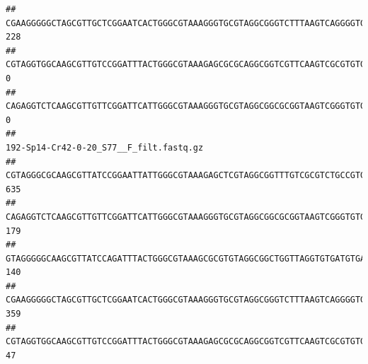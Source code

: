 \documentclass[]{article}
\begin{document}
\begin{verbatim}
## CGAAGGGGGCTAGCGTTGCTCGGAATCACTGGGCGTAAAGGGTGCGTAGGCGGGTCTTTAAGTCAGGGGTGAAATCCTGGAGCTCAACTCCAGAACTGCCTTTGATACTGAAGATCTTGAGTTCGGGAGAGGTGAGTGGAACTGCGAGTGTAGAGGTGAAATTCGTAGATATTCGCAAGAACACCAGTGGCGAAGGCGGCTCACTGGCCCGATACTGACGCTGAGGCACGAAAGCGTGGGGAGCAAACA                                     228
## CGTAGGTGGCAAGCGTTGTCCGGATTTACTGGGCGTAAAGAGCGCGCAGGCGGTCGTTCAAGTCGCGTGTGAAAGCCCCCGGCTCAACTGGGGAGGGTCACGCGATACTGATCGACTCGAAGGCAGGAGAGGGTAGTGGAATTCCCGGTGTAGTGGTGAAATGCGTAGATATCGGGAGGAACACCAGTGGCGAAGGCGACTACCTGGCCTGTTCTTGACGCTGAGGCGCGAAAGCTAGGGGAGCAAACG                                       0
## CAGAGGTCTCAAGCGTTGTTCGGATTCATTGGGCGTAAAGGGTGCGTAGGCGGCGCGGTAAGTCGGGTGTGAAATCTCGGGGCTTAACTCCGAAACTGCATTCGATACTGCCGTGCTTGAGGACTGGAGAGGAGACTGGAATTTACGGTGTAGCGGTGAAATGCGTAGATATCGTAAGGAAGACCAGTGGCGAAGGCGGGTCTCTGGACAGTTCCTGACGCTGAGGCACGAAGGCCAGGGGAGCAAACG                                       0
##                                                                                                                                                                                                                                                           192-Sp14-Cr42-0-20_S77__F_filt.fastq.gz
## CGTAGGGCGCAAGCGTTATCCGGAATTATTGGGCGTAAAGAGCTCGTAGGCGGTTTGTCGCGTCTGCCGTGAAAGTCCGGGGCTCAACTCCGGATCTGCGGTGGGTACGGGCAGACTAGAGTGATGTAGGGGAGACTGGAATTCCTGGTGTAGCGGTGAAATGCGCAGATATCAGGAGGAACACCGATGGCGAAGGCAGGTCTCTGGGCATTAACTGACGCTGAGGAGCGAAAGCATGGGGAGCGAACA                                     635
## CAGAGGTCTCAAGCGTTGTTCGGATTCATTGGGCGTAAAGGGTGCGTAGGCGGCGCGGTAAGTCGGGTGTGAAATCTCGGAGCTTAACTCCGAAACTGCATTCGATACTGCCGTGCTTGAGGACTGGAGAGGAGACTGGAATTTACGGTGTAGCGGTGAAATGCGTAGATATCGTAAGGAAGACCAGTGGCGAAGGCGGGTCTCTGGACAGTTCCTGACGCTGAGGCACGAAGGCCAGGGGAGCAAACG                                     179
## GTAGGGGGCAAGCGTTATCCAGATTTACTGGGCGTAAAGCGCGTGTAGGCGGCTGGTTAGGTGTGATGTGAAATCTTCCGGCTCAACCGGAAAACTGCATTGCAAACCGGCCTGGCTAGAGTGCAGGAGAGGGAAGCGGAATTCCAGGTGTAGCGGTGAAATGCGTAGATATCTGGAGGAACACCAGTGGCGAAGGCGGCTTCCTGGCCTGCAACTGACGCTGAGACGCGAAAGCGTGGGGAGCGAAC                                      140
## CGAAGGGGGCTAGCGTTGCTCGGAATCACTGGGCGTAAAGGGTGCGTAGGCGGGTCTTTAAGTCAGGGGTGAAATCCTGGAGCTCAACTCCAGAACTGCCTTTGATACTGAAGATCTTGAGTTCGGGAGAGGTGAGTGGAACTGCGAGTGTAGAGGTGAAATTCGTAGATATTCGCAAGAACACCAGTGGCGAAGGCGGCTCACTGGCCCGATACTGACGCTGAGGCACGAAAGCGTGGGGAGCAAACA                                     359
## CGTAGGTGGCAAGCGTTGTCCGGATTTACTGGGCGTAAAGAGCGCGCAGGCGGTCGTTCAAGTCGCGTGTGAAAGCCCCCGGCTCAACTGGGGAGGGTCACGCGATACTGATCGACTCGAAGGCAGGAGAGGGTAGTGGAATTCCCGGTGTAGTGGTGAAATGCGTAGATATCGGGAGGAACACCAGTGGCGAAGGCGACTACCTGGCCTGTTCTTGACGCTGAGGCGCGAAAGCTAGGGGAGCAAACG                                      47

\end{verbatim}
\end{document}
